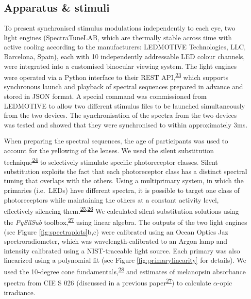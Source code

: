 \documentclass[
]{article}
\begin{document}
\hypertarget{apparatus-stimuli}{%
\subsection{Apparatus \& stimuli}\label{apparatus-stimuli}}

To present synchronised stimulus modulations independently to each eye, two light engines (SpectraTuneLAB, which are thermally stable across time with active cooling according to the manufacturers: LEDMOTIVE Technologies, LLC, Barcelona, Spain), each with 10 independently addressable LED colour channels, were integrated into a customised binocular viewing system. The light engines were operated via a Python interface to their REST API,\textsuperscript{\protect\hyperlink{ref-Martin2022}{23}} which supports synchronous launch and playback of spectral sequences prepared in advance and stored in JSON format. A special command was commissioned from LEDMOTIVE to allow two different stimulus files to be launched simultaneously from the two devices. The synchronisation of the spectra from the two devices was tested and showed that they were synchronised to within approximately 3ms.

When preparing the spectral sequences, the age of participants was used to account for the yellowing of the lenses. We used the silent substitution technique\textsuperscript{\protect\hyperlink{ref-Estevez1982}{24}} to selectively stimulate specific photoreceptor classes. Silent substitution exploits the fact that each photoreceptor class has a distinct spectral tuning that overlaps with the others. Using a multiprimary system, in which the primaries (i.e.~LEDs) have different spectra, it is possible to target one class of photoreceptors while maintaining the others at a constant activity level, effectively silencing them.\textsuperscript{\protect\hyperlink{ref-Shapiro1996}{25},\protect\hyperlink{ref-Spitschan2018}{26}} We calculated silent substitution solutions using the \emph{PySilSub} toolbox,\textsuperscript{\protect\hyperlink{ref-Martin2023}{27}} using linear algebra. The outputs of the two light engines (see Figure \ref{fig:spectraplots}b,c) were calibrated using an Ocean Optics Jaz spectroradiometer, which was wavelength-calibrated to an Argon lamp and intensity calibrated using a NIST-traceable light source. Each primary was also linearized using a polynomial fit (see Figure \ref{fig:primarylinearity} for details). We used the 10-degree cone fundamentals,\textsuperscript{\protect\hyperlink{ref-Stockman2000}{28}} and estimates of melanopsin absorbance spectra from CIE S 026 (discussed in a previous paper\textsuperscript{\protect\hyperlink{ref-Martin2023}{27}}) to calculate \(\alpha\)-opic irradiance.
\end{document}
